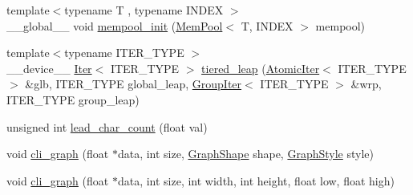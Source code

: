 \begin{DoxyCompactItemize}
\item 
{\footnotesize template$<$typename T , typename I\-N\-D\-E\-X $>$ }\\\-\_\-\-\_\-global\-\_\-\-\_\- void \hyperlink{namespaceutil_a57925d80c15cfe01983f2a80ae7f0b4b}{mempool\-\_\-init} (\hyperlink{structutil_1_1MemPool}{Mem\-Pool}$<$ T, I\-N\-D\-E\-X $>$ mempool)
\item 
{\footnotesize template$<$typename I\-T\-E\-R\-\_\-\-T\-Y\-P\-E $>$ }\\\-\_\-\-\_\-device\-\_\-\-\_\- \hyperlink{structutil_1_1Iter}{Iter}$<$ I\-T\-E\-R\-\_\-\-T\-Y\-P\-E $>$ \hyperlink{namespaceutil_a225ce7cb36b08ae04d4cf0d5243b7071}{tiered\-\_\-leap} (\hyperlink{structutil_1_1AtomicIter}{Atomic\-Iter}$<$ I\-T\-E\-R\-\_\-\-T\-Y\-P\-E $>$ \&glb, I\-T\-E\-R\-\_\-\-T\-Y\-P\-E global\-\_\-leap, \hyperlink{structutil_1_1GroupIter}{Group\-Iter}$<$ I\-T\-E\-R\-\_\-\-T\-Y\-P\-E $>$ \&wrp, I\-T\-E\-R\-\_\-\-T\-Y\-P\-E group\-\_\-leap)
\item 
unsigned int \hyperlink{namespaceutil_a18ff3fab0dab5fac26d6c336776d90a4}{lead\-\_\-char\-\_\-count} (float val)
\item 
void \hyperlink{namespaceutil_a9c3e0af81aa97251f3d254f1f07103a8}{cli\-\_\-graph} (float $\ast$data, int size, \hyperlink{structutil_1_1GraphShape}{Graph\-Shape} shape, \hyperlink{structutil_1_1GraphStyle}{Graph\-Style} style)
\item 
void \hyperlink{namespaceutil_ab918555f7b94c60d9ae6fba0a6fafe42}{cli\-\_\-graph} (float $\ast$data, int size, int width, int height, float low, float high)
\end{DoxyCompactItemize}
